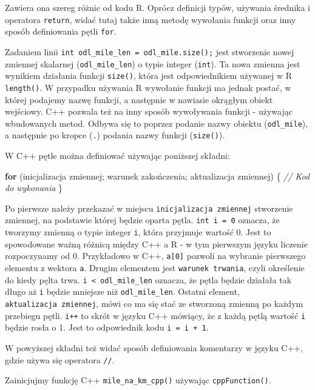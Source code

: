 \documentclass[paper=6in:9in,pagesize=pdftex,headinclude=on,footinclude=on,10pt]{scrbook}
\newenvironment{Shaded}{\begin{snugshade}}{\end{snugshade}}
\newcommand{\CommentTok}[1]{\textcolor[rgb]{0.56,0.35,0.01}{\textit{#1}}}
\newcommand{\ControlFlowTok}[1]{\textcolor[rgb]{0.13,0.29,0.53}{\textbf{#1}}}
\newcommand{\NormalTok}[1]{#1}
\begin{document}
Zawiera ona szereg różnic od kodu R.
Oprócz definicji typów, używania średnika i operatora \texttt{return}, widać tutaj także inną metodę wywołania funkcji oraz inny sposób definiowania pętli \texttt{for}.

Zadaniem linii \texttt{int\ odl\_mile\_len\ =\ odl\_mile.size();} jest stworzenie nowej zmiennej skalarnej (\texttt{odl\_mile\_len}) o typie integer (\texttt{int}).
Ta nowa zmienna jest wynikiem działania funkcji \texttt{size()}, która jest odpowiednikiem używanej w R \texttt{length()}.
W przypadku używania R wywołanie funkcji ma jednak postać, w której podajemy nazwę funkcji, a następnie w nawiasie okrągłym obiekt wejściowy.
C++ pozwala też na inny sposób wywoływania funkcji - używając wbudowanych metod.
Odbywa się to poprzez podanie nazwy obiektu (\texttt{odl\_mile}), a następnie po kropce (\texttt{.}) podania nazwy funkcji (\texttt{size()}).

W C++ pętle można definiować używając poniższej składni:

\begin{Shaded}
\begin{Highlighting}[]
\ControlFlowTok{for}\NormalTok{ (inicjalizacja zmiennej; warunek zakończenia; aktualizacja zmiennej) \{}
  \CommentTok{// Kod do wykonania}
\NormalTok{\}}
\end{Highlighting}
\end{Shaded}

Po pierwsze należy przekazać w miejscu \texttt{inicjalizacja\ zmiennej} stworzenie zmiennej, na podstawie której będzie oparta pętla.
\texttt{int\ i\ =\ 0} oznacza, że tworzymy zmienną o typie integer \texttt{i}, która przyjmuje wartość 0.
Jest to spowodowane ważną różnicą między C++ a R - w tym pierwszym języku liczenie rozpoczynamy od 0.
Przykładowo w C++, \texttt{a{[}0{]}} pozwoli na wybranie pierwszego elementu z wektora \texttt{a}.
Drugim elementem jest \texttt{warunek\ trwania}, czyli określenie do kiedy pęlta trwa.
\texttt{i\ \textless{}\ odl\_mile\_len} oznacza, że pętla będzie działała tak długo aż \texttt{i} będzie mniejsze niż \texttt{odl\_mile\_len}.
Ostatni element, \texttt{aktualizacja\ zmiennej}, mówi co ma się stać ze stworzoną zmienną po każdym przebiegu pętli.
\texttt{i++} to skrót w języku C++ mówiący, że z każdą pętlą wartość \texttt{i} będzie rosła o 1.
Jest to odpowiednik kodu \texttt{i\ =\ i\ +\ 1}.

W powyższej składni też widać sposób definiowania komentarzy w języku C++, gdzie używa się operatora \texttt{//}.

Zainicjujmy funkcję C++ \texttt{mile\_na\_km\_cpp()} używając \texttt{cppFunction()}.
\end{document}
